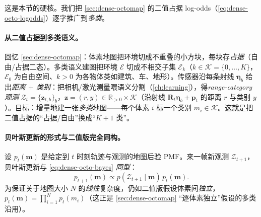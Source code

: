 这是本节的硬核。我们把 \cref{sec:dense-octomap} 的二值占据 log-odds（\cref{eq:dense-octo-logodds}）逐字推广到\emph{多类}。

\paragraph{从二值占据到多类语义。}
回忆 \cref{sec:dense-octomap}：体素地图把环境切成不重叠的小方块，每块存\emph{占据}（自由/占据二态）。多类语义建图把环境 $\mathcal{E}$ 切成不相交子集 $\mathcal{E}_k$（$k\in\mathcal{K}=\{0,\dots,K\}$，$\mathcal{E}_0$ 为自由空间、$k{>}0$ 为各物体类如建筑、车、地形）\cite{asgharivaskasi2023semantic}。传感器沿每条射线 $\boldsymbol\eta_b$ 给出\emph{距离 $+$ 类别}：把相机/激光测量喂语义分割（\cref{ch:learning}），得\emph{range-category 观测} $\mathcal{Z}_t=\{\mathbf{z}_{t,b}\}_b$，$\mathbf{z}=(r,y)\in\mathbb{R}_{>0}\times\mathcal{K}$（沿射线 $\mathbf{R}_t\boldsymbol\eta_b+\mathbf{p}_t$ 的距离 $r$ 与类别 $y$）\cite{asgharivaskasi2023semantic}。目标：增量地建一张\emph{多类}地图——每个体素 $i$ 标一个类别 $m_i\in\mathcal{K}$。这就是把二值占据的“占据/自由”换成“$K{+}1$ 类”。

\paragraph{贝叶斯更新的形式与二值版完全同构。}
设 $p_t(\mathbf{m})$ 是给定到 $t$ 时刻轨迹与观测的地图后验 PMF。来一帧新观测 $\mathcal{Z}_{t+1}$，贝叶斯更新与 \cref{eq:dense-octo-bayes} \emph{同型}：
\begin{equation}
  p_{t+1}(\mathbf{m})\propto p(\mathcal{Z}_{t+1}\mid\mathbf{m})\,p_t(\mathbf{m}).
  \label{eq:semantic-bayes}
\end{equation}
为保证关于地图大小 $N$ 的\emph{线性}复杂度，仍如二值版假设体素间\emph{独立}，$p_t(\mathbf{m})=\prod_{i=1}^N p_t(m_i)$\cite{asgharivaskasi2023semantic}（这正是 \cref{sec:dense-octomap} “逐体素独立”假设的多类沿用）。

